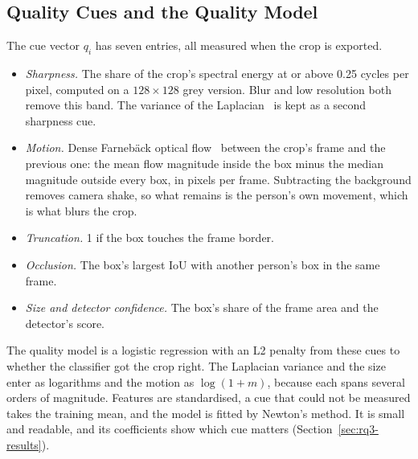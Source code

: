 \subsection{Quality Cues and the Quality Model}
The cue vector $q_i$ has seven entries, all measured when the crop is exported.
\begin{itemize}
  \item \emph{Sharpness.} The share of the crop's spectral energy at or above
        0.25 cycles per pixel, computed on a $128\times128$ grey version. Blur
        and low resolution both remove this band. The variance of the
        Laplacian~\cite{pech2000laplacian} is kept as a second sharpness cue.
  \item \emph{Motion.} Dense Farneb\"ack optical flow~\cite{farneback2003flow}
        between the crop's frame and the previous one: the mean flow magnitude
        inside the box minus the median magnitude outside every box, in pixels
        per frame. Subtracting the background removes camera shake, so what
        remains is the person's own movement, which is what blurs the crop.
  \item \emph{Truncation.} 1 if the box touches the frame border.
  \item \emph{Occlusion.} The box's largest IoU with another person's box in the
        same frame.
  \item \emph{Size and detector confidence.} The box's share of the frame area
        and the detector's score.
\end{itemize}
The quality model is a logistic regression with an L2 penalty from these cues
to whether the classifier got the crop right. The Laplacian variance and the
size enter as logarithms and the motion as $\log(1+m)$, because each spans
several orders of magnitude. Features are standardised, a cue that could not be
measured takes the training mean, and the model is fitted by Newton's method.
It is small and readable, and its coefficients show which cue matters
(Section~\ref{sec:rq3-results}).

